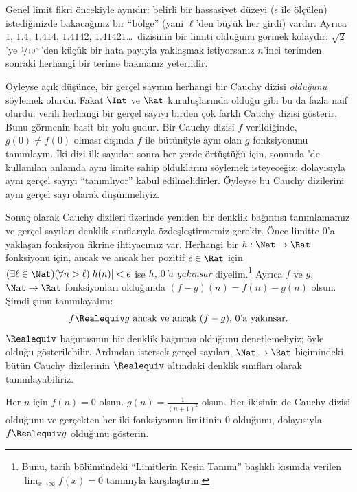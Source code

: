 Genel limit fikri öncekiyle aynıdır: belirli bir hassasiyet düzeyi
($\epsilon$ ile ölçülen) istediğinizde bakacağınız bir “bölge” (yani
$\ell$'den büyük her girdi) vardır. Ayrıca $1$, $1.4$, $1.414$, $1.4142$,
$1.41421$\ldots\ dizisinin bir limiti olduğunu görmek kolaydır:
$\sqrt{2}$'ye $\nicefrac{1}{10^{n}}$'den küçük bir hata payıyla yaklaşmak
istiyorsanız $n$'inci terimden sonraki herhangi bir terime bakmanız yeterlidir.

Öyleyse açık düşünce, bir gerçel sayının herhangi bir Cauchy dizisi
\emph{olduğunu} söylemek olurdu. Fakat $\Int$ ve $\Rat$ kuruluşlarında olduğu
gibi bu da fazla naif olurdu: verili herhangi bir gerçel sayıyı birden çok
farklı Cauchy dizisi gösterir. Bunu görmenin basit bir yolu şudur. Bir Cauchy
dizisi $f$ verildiğinde, $g(0)\neq f(0)$ olması dışında $f$ ile bütünüyle aynı
olan $g$ fonksiyonunu tanımlayın. İki dizi ilk sayıdan sonra her yerde
örtüştüğü için, sonunda 'de kullanılan anlamda aynı
limite sahip olduklarını söylemek isteyeceğiz; dolayısıyla aynı gerçel sayıyı
“tanımlıyor” kabul edilmelidirler. Öyleyse bu Cauchy dizilerini aynı gerçel sayı
olarak düşünmeliyiz.

Sonuç olarak Cauchy dizileri üzerinde yeniden bir denklik bağıntısı
tanımlamamız ve gerçel sayıları denklik sınıflarıyla özdeşleştirmemiz gerekir.
Önce limitte $0$'a yaklaşan fonksiyon fikrine ihtiyacımız var. Herhangi bir
$h : \Nat \to \Rat$ fonksiyonu için, ancak ve ancak her pozitif
$\epsilon \in \Rat$ için
$(\exists \ell \in \Nat)(\forall n > \ell)|h(n)| < \epsilon$ ise
\emph{$h$, $0$'a yakınsar} diyelim.\footnote{Bunu, tarih bölümündeki
“Limitlerin Kesin Tanımı” başlıklı kısımda verilen
$\lim_{x \mathord{\rightarrow}\infty}f(x) = 0$ tanımıyla karşılaştırın.}
Ayrıca $f$ ve $g$, $\Nat \to \Rat$ fonksiyonları olduğunda
$(f-g)(n) = f(n) - g(n)$ olsun. Şimdi şunu tanımlayalım:
\[
	f \Realequiv g \text{ ancak ve ancak $(f-g)$, $0$'a yakınsar.}
\]
$\Realequiv$ bağıntısının bir denklik bağıntısı olduğunu denetlemeliyiz; öyle
olduğu gösterilebilir. Ardından istersek gerçel sayıları, $\Nat \to \Rat$
biçimindeki bütün Cauchy dizilerinin $\Realequiv$ altındaki denklik sınıfları olarak
tanımlayabiliriz.

\begin{prob}
Her $n$ için $f(n) = 0$ olsun. $g(n) = \frac{1}{(n+1)^2}$ olsun. Her ikisinin
de Cauchy dizisi olduğunu ve gerçekten her iki fonksiyonun limitinin $0$
olduğunu, dolayısıyla $f \Realequiv g$ olduğunu gösterin.
\end{prob}

